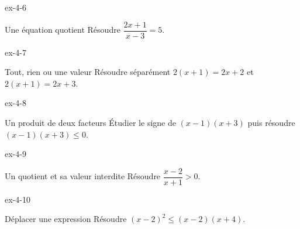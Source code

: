 \clearpage{}
\begin{blocLivre}{ex-4-6}
\begin{exercice}[2]{Une équation quotient}
Résoudre $\dfrac{2x+1}{x-3}=5$.
\end{exercice}
\end{blocLivre}
\begin{blocLivre}{ex-4-7}
\begin{exercice}[2]{Tout, rien ou une valeur}
Résoudre séparément $2(x+1)=2x+2$ et $2(x+1)=2x+3$.
\end{exercice}
\end{blocLivre}
\begin{blocLivre}{ex-4-8}
\begin{exercice}[2]{Un produit de deux facteurs}
Étudier le signe de $(x-1)(x+3)$ puis résoudre $(x-1)(x+3)\le0$.
\label{fig-ex-4-8}
\end{exercice}
\end{blocLivre}
\begin{blocLivre}{ex-4-9}
\begin{exercice}[2]{Un quotient et sa valeur interdite}
Résoudre $\dfrac{x-2}{x+1}>0$.
\label{fig-ex-4-9}
\end{exercice}
\end{blocLivre}
\begin{blocLivre}{ex-4-10}
\begin{exercice}[2]{Déplacer une expression}
Résoudre $(x-2)^2\le(x-2)(x+4)$.
\end{exercice}
\end{blocLivre}

